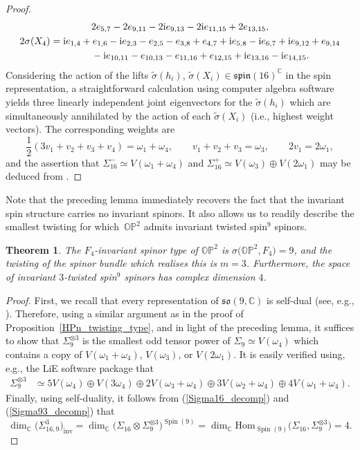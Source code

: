 \documentclass[pdftex]{sigma}
\numberwithin{equation}{section}
\newtheorem{Theorem}{Theorem}[section]
\newcommand{\C}{\mathbb{C}} %
\DeclareMathOperator{\inv}{inv}
\DeclareMathOperator{\Spin}{Spin}
\begin{document}
\begin{proof}
\begin{gather*}
				2 e_{5, 7} - 2 e_{9, 11} - 2 {\rm i} e_{9, 13} -
				2 {\rm i} e_{11, 15} + 2 e_{13, 15} ,\\
				2\sigma(X_{4})= {\rm i} e_{1, 4} + e_{1, 6} - {\rm i} e_{2, 3} -
				e_{2, 5} - e_{3, 8} + e_{4, 7} +
				{\rm i} e_{5, 8} - {\rm i} e_{6, 7} + {\rm i} e_{9, 12} +
				e_{9, 14} \\
\phantom{2\sigma(X_{4})=}{}- {\rm i} e_{10, 11} - e_{10, 13} -
				e_{11, 16} + e_{12, 15} + {\rm i} e_{13, 16} -
				{\rm i} e_{14, 15} .
			\end{gather*}
			Considering the action of the lifts $\widetilde{\sigma}(h_i)$, $\widetilde{\sigma}(X_{i}) \in\mathfrak{spin}(16)^{\C} $ in the spin representation, a straightforward calculation using computer algebra software yields three linearly independent joint eigenvectors for the $\widetilde{\sigma}(h_i)$ which are simultaneously annihilated by the action of each $\widetilde{\sigma}(X_{i})$ (i.e., highest weight vectors). The corresponding weights are
			\[
			\frac{1}{2}(3v_1 +v_2+v_3+v_4) = \omega_1 + \omega_4, \qquad v_1+v_2+v_3 = \omega_3 , \qquad 2v_1 = 2\omega_1 ,
			\]
			and the assertion that $\Sigma_{16}^- \simeq V(\omega_1+\omega_4)$ and $\Sigma_{16}^+ \simeq V(\omega_3)\oplus V(2\omega_1) $ may be deduced from \cite[Section~7]{Fri01_weak_spin9}.
		\end{proof}

		Note that the preceding lemma immediately recovers the fact that the invariant spin structure carries no invariant spinors. It also allows us to readily describe the smallest twisting for which~$\mathbb{OP}^2$ admits invariant twisted spin$^9$ spinors.
		\begin{Theorem}
			The $F_4$-invariant spinor type of $\mathbb{OP}^2$ is $\sigma\bigl(\mathbb{OP}^2,F_4\bigr)=9$, and the twisting of the spinor bundle which realises this is $m=3$. Furthermore, the space of invariant $3$-twisted spin$^9$ spinors has complex dimension $4$.
		\end{Theorem}
		\begin{proof}
			First, we recall that every representation of $\mathfrak{so}(9,\C)$ is self-dual (see, e.g., \cite{Samelson}). Therefore, using a similar argument as in the proof of Proposition~\ref{HPn_twisting_type}, and in light of the preceding lemma, it suffices to show that $\Sigma_9^{\otimes 3}$ is the smallest odd tensor power of $\Sigma_9\simeq V(\omega_4)$ which contains a copy of $V(\omega_1+\omega_4)$, $V(\omega_3)$, or $V(2\omega_1)$. It is easily verified using, e.g., the LiE software package \cite{LiE} that \begin{align} \label{Sigma93_decomp}\Sigma_9^{\otimes 3} &\simeq 5 V(\omega_4) \oplus V(3\omega_4) \oplus 2V(\omega_3+\omega_4)\oplus 3V(\omega_2+\omega_4) \oplus 4V(\omega_1+\omega_4 ) .
			\end{align}
			Finally, using self-duality, it follows from (\ref{Sigma16_decomp}) and (\ref{Sigma93_decomp}) that
			\[
			\dim_{\C} \bigl(\Sigma_{16,9}^3\bigr)_{\inv} = \dim_{\C} \bigl(\Sigma_{16} \otimes \Sigma_9^{\otimes 3}\bigr)^{\Spin(9)} = \dim_{\C} \text{Hom}_{\Spin(9)}\bigl(\Sigma_{16} , \Sigma_9^{\otimes 3}\bigr) = 4.\tag*{\qed}
			\] \renewcommand{\qed}{}
		\end{proof}
\end{document}
